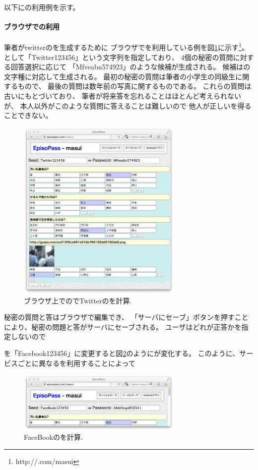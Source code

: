 \documentclass[twoside]{wiss}
\begin{document}
以下に{\EP}の利用例を示す。

\paragraph{ブラウザでの利用}

筆者がtwitterの{\PW}を生成するために
ブラウザで{\EP}を利用している例を図\ref{web1}に示す\footnote{
  \textsf{http://{\EP}.com/masui}
}。
{\SS}として「\textsf{Twitter123456}」という文字列を指定しており、
4個の秘密の質問に対する回答選択に応じて
「\textsf{Mfveabn574923}」のような{\PW}候補が生成される。
{\PW}候補は{\SS}の文字種に対応して生成される。
最初の秘密の質問は筆者の小学生の同級生に関するもので、
最後の質問は数年前の写真に関するものである。
これらの質問は古い{\EM}にもとづいており、
筆者が将来答を忘れることはほとんど考えられないが、
本人以外がこのような質問に答えることは難しいので
他人が正しい{\PW}を得ることできない。

\begin{figure}
\centerline{\includegraphics[width=80mm,bb=0 0 718 796]{figures/785ff09b4233804d2ec89c3af71ee5d0.png}}
\caption{ブラウザ上での{\EP}でTwitterの{\PW}を計算.}
\label{web1}
\end{figure}

秘密の質問と答はブラウザで編集でき、
「サーバにセーブ」ボタンを押すことにより{\SS}、秘密の問題と答がサーバにセーブされる。
ユーザはどれが正答かを指定しないので

{\SS}を「\textsf{Facebook123456}」に変更すると図\ref{web2}のように{\PW}が変化する。
このように、サービスごとに異なる{\SS}を利用することによって

\begin{figure}
\centerline{\includegraphics[width=80mm,bb=0 0 718 265]{figures/36c371a13a8250c60fb9c03174382443.png}}
\caption{FaceBookの{\PW}を計算.}
\label{web2}
\end{figure}
\end{document}
